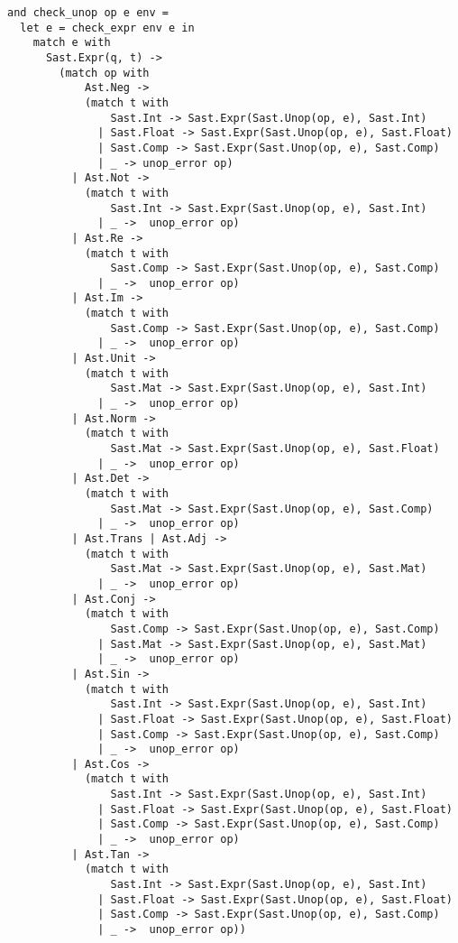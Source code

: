 \begin{lstlisting}
and check_unop op e env =
  let e = check_expr env e in 
    match e with
      Sast.Expr(q, t) ->
        (match op with
            Ast.Neg ->
            (match t with
                Sast.Int -> Sast.Expr(Sast.Unop(op, e), Sast.Int)
              | Sast.Float -> Sast.Expr(Sast.Unop(op, e), Sast.Float)
              | Sast.Comp -> Sast.Expr(Sast.Unop(op, e), Sast.Comp)
              | _ -> unop_error op)
          | Ast.Not ->
            (match t with
                Sast.Int -> Sast.Expr(Sast.Unop(op, e), Sast.Int)
              | _ ->  unop_error op)
          | Ast.Re ->
            (match t with
                Sast.Comp -> Sast.Expr(Sast.Unop(op, e), Sast.Comp)
              | _ ->  unop_error op)
          | Ast.Im -> 
            (match t with
                Sast.Comp -> Sast.Expr(Sast.Unop(op, e), Sast.Comp)
              | _ ->  unop_error op)
          | Ast.Unit ->
            (match t with
                Sast.Mat -> Sast.Expr(Sast.Unop(op, e), Sast.Int)
              | _ ->  unop_error op)
          | Ast.Norm ->
            (match t with
                Sast.Mat -> Sast.Expr(Sast.Unop(op, e), Sast.Float)
              | _ ->  unop_error op)
          | Ast.Det ->
            (match t with
                Sast.Mat -> Sast.Expr(Sast.Unop(op, e), Sast.Comp)
              | _ ->  unop_error op)
          | Ast.Trans | Ast.Adj ->
            (match t with
                Sast.Mat -> Sast.Expr(Sast.Unop(op, e), Sast.Mat)
              | _ ->  unop_error op)
          | Ast.Conj ->
            (match t with
                Sast.Comp -> Sast.Expr(Sast.Unop(op, e), Sast.Comp)
              | Sast.Mat -> Sast.Expr(Sast.Unop(op, e), Sast.Mat)
              | _ ->  unop_error op)
          | Ast.Sin -> 
            (match t with
                Sast.Int -> Sast.Expr(Sast.Unop(op, e), Sast.Int)
              | Sast.Float -> Sast.Expr(Sast.Unop(op, e), Sast.Float)
              | Sast.Comp -> Sast.Expr(Sast.Unop(op, e), Sast.Comp)
              | _ ->  unop_error op)
          | Ast.Cos -> 
            (match t with
                Sast.Int -> Sast.Expr(Sast.Unop(op, e), Sast.Int)
              | Sast.Float -> Sast.Expr(Sast.Unop(op, e), Sast.Float)
              | Sast.Comp -> Sast.Expr(Sast.Unop(op, e), Sast.Comp)
              | _ ->  unop_error op)
          | Ast.Tan -> 
            (match t with
                Sast.Int -> Sast.Expr(Sast.Unop(op, e), Sast.Int)
              | Sast.Float -> Sast.Expr(Sast.Unop(op, e), Sast.Float)
              | Sast.Comp -> Sast.Expr(Sast.Unop(op, e), Sast.Comp)
              | _ ->  unop_error op))


\end{lstlisting}
